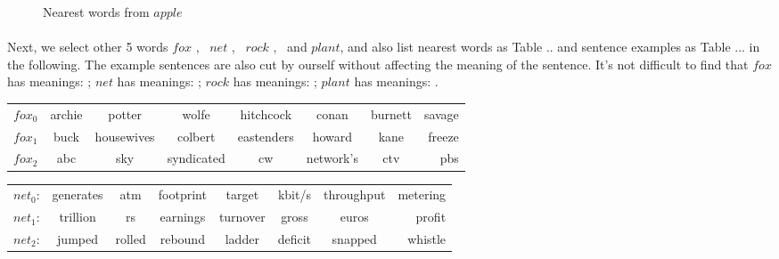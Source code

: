 \begin{figure}[!ht]
  \centering
	\caption{Nearest words from $apple$}
	\label{fig:apple}
\end{figure}



\paragraph{} Next, we select other 5 words $fox$ , \ $net$ , \ $rock$ , \ and $plant$, and also list nearest words as Table .. and sentence examples as Table ... in the following. The example sentences are also cut by ourself without affecting the meaning of the sentence. It's not difficult to find that $fox$ has meanings: ; $net$ has meanings: ; $rock$ has meanings: ; $plant$ has meanings: . 


\begin{center} \begin{tabular}{l*{6}{c}r}  $fox_0$ & archie& potter& wolfe& hitchcock& conan& burnett& savage  \\ $fox_1$ & buck& housewives& colbert& eastenders& howard& kane& freeze
 \\ $fox_2$ & abc& sky& syndicated& cw& network's& ctv& pbs \\ \end{tabular} \end{center}

\begin{center} \begin{tabular}{l*{6}{c}r}   $net_0$: & generates& atm& footprint& target& kbit/s& throughput& metering   \\  $net_1$: & trillion& rs& earnings& turnover& gross& euros& profit  
 \\  $net_2$: &jumped& rolled& rebound& ladder& deficit& snapped& whistle   \\  \end{tabular} \end{center}
 
